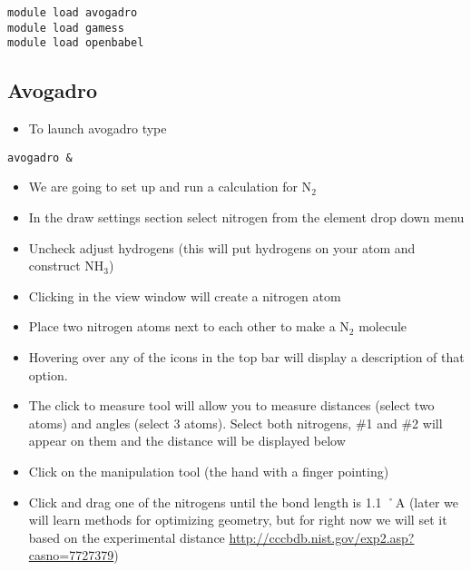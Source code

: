 \documentclass[11pt]{article}
\begin{document}
\begin{verbatim}
module load avogadro
module load gamess
module load openbabel
\end{verbatim}

\subsection{Avogadro}
\label{sec-1-3}

\begin{itemize}
\item To launch avogadro type
\end{itemize}

\begin{verbatim}
avogadro &
\end{verbatim}

\begin{itemize}
\item We are going to set up and run a calculation for N$_{\text{2}}$

\item In the draw settings section select nitrogen from the element drop down menu

\item Uncheck adjust hydrogens (this will put hydrogens on your atom and construct NH$_{\text{3}}$)

\item Clicking in the view window will create a nitrogen atom

\item Place two nitrogen atoms next to each other to make a N$_{\text{2}}$ molecule

\item Hovering over any of the icons in the top bar will display a description of that option.

\item The click to measure tool will allow you to measure distances (select two atoms) and angles (select 3 atoms). Select both nitrogens, \#1 and \#2 will appear on them and the distance will be displayed below

\item Click on the manipulation tool (the hand with a finger pointing)

\item Click and drag one of the nitrogens until the bond length is 1.1 ˚A (later we will learn methods for optimizing geometry, but for right now we will set it based on the experimental distance \url{http://cccbdb.nist.gov/exp2.asp?casno=7727379})
\end{itemize}
\end{document}
